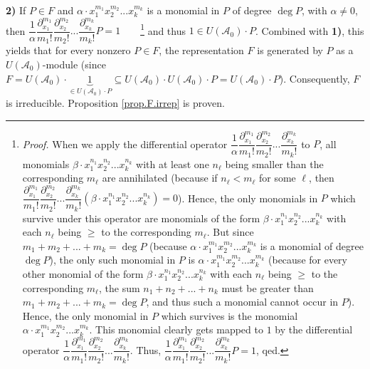 \documentclass
[numbers=enddot,12pt,final,onecolumn,german,notitlepage]{scrartcl}%
\theoremstyle{definition}
\begin{document}
\textbf{2)} If $P\in F$ and $\alpha\cdot x_{1}^{m_{1}}x_{2}^{m_{2}}%
...x_{k}^{m_{k}}$ is a monomial in $P$ of degree $\deg P$, with $\alpha\neq0$,
then $\dfrac{1}{\alpha}\dfrac{\partial_{x_{1}}^{m_{1}}}{m_{1}!}\dfrac
{\partial_{x_{2}}^{m_{2}}}{m_{2}!}...\dfrac{\partial_{x_{k}}^{m_{k}}}{m_{k}%
!}P=1$\ \ \ \ \footnote{\textit{Proof.} When we apply the differential
operator $\dfrac{1}{\alpha}\dfrac{\partial_{x_{1}}^{m_{1}}}{m_{1}!}%
\dfrac{\partial_{x_{2}}^{m_{2}}}{m_{2}!}...\dfrac{\partial_{x_{k}}^{m_{k}}%
}{m_{k}!}$ to $P$, all monomials $\beta\cdot x_{1}^{n_{1}}x_{2}^{n_{2}%
}...x_{k}^{n_{k}}$ with at least one $n_{\ell}$ being smaller than the
corresponding $m_{\ell}$ are annihilated (because if $n_{\ell}<m_{\ell}$ for
some $\ell$, then $\dfrac{\partial_{x_{1}}^{m_{1}}}{m_{1}!}\dfrac
{\partial_{x_{2}}^{m_{2}}}{m_{2}!}...\dfrac{\partial_{x_{k}}^{m_{k}}}{m_{k}%
!}\left(  \beta\cdot x_{1}^{n_{1}}x_{2}^{n_{2}}...x_{k}^{n_{k}}\right)  =0$).
Hence, the only monomials in $P$ which survive under this operator are
monomials of the form $\beta\cdot x_{1}^{n_{1}}x_{2}^{n_{2}}...x_{k}^{n_{k}}$
with each $n_{\ell}$ being $\geq$ to the corresponding $m_{\ell}$. But since
$m_{1}+m_{2}+...+m_{k}=\deg P$ (because $\alpha\cdot x_{1}^{m_{1}}x_{2}%
^{m_{2}}...x_{k}^{m_{k}}$ is a monomial of degree $\deg P$), the only such
monomial in $P$ is $\alpha\cdot x_{1}^{m_{1}}x_{2}^{m_{2}}...x_{k}^{m_{k}}$
(because for every other monomial of the form $\beta\cdot x_{1}^{n_{1}}%
x_{2}^{n_{2}}...x_{k}^{n_{k}}$ with each $n_{\ell}$ being $\geq$ to the
corresponding $m_{\ell}$, the sum $n_{1}+n_{2}+...+n_{k}$ must be greater than
$m_{1}+m_{2}+...+m_{k}=\deg P$, and thus such a monomial cannot occur in $P$).
Hence, the only monomial in $P$ which survives is the monomial $\alpha\cdot
x_{1}^{m_{1}}x_{2}^{m_{2}}...x_{k}^{m_{k}}$. This monomial clearly gets mapped
to $1$ by the differential operator $\dfrac{1}{\alpha}\dfrac{\partial_{x_{1}%
}^{m_{1}}}{m_{1}!}\dfrac{\partial_{x_{2}}^{m_{2}}}{m_{2}!}...\dfrac
{\partial_{x_{k}}^{m_{k}}}{m_{k}!}$. Thus, $\dfrac{1}{\alpha}\dfrac
{\partial_{x_{1}}^{m_{1}}}{m_{1}!}\dfrac{\partial_{x_{2}}^{m_{2}}}{m_{2}%
!}...\dfrac{\partial_{x_{k}}^{m_{k}}}{m_{k}!}P=1$, qed.} and thus $1\in
U\left(  \mathcal{A}_{0}\right)  \cdot P$. Combined with \textbf{1)}, this
yields that for every nonzero $P\in F$, the representation $F$ is generated by
$P$ as a $U\left(  \mathcal{A}_{0}\right)  $-module (since $F=U\left(
\mathcal{A}_{0}\right)  \cdot\underbrace{1}_{\in U\left(  \mathcal{A}%
_{0}\right)  \cdot P}\subseteq U\left(  \mathcal{A}_{0}\right)  \cdot U\left(
\mathcal{A}_{0}\right)  \cdot P=U\left(  \mathcal{A}_{0}\right)  \cdot P$).
Consequently, $F$ is irreducible. Proposition \ref{prop.F.irrep} is proven.
\end{document}
